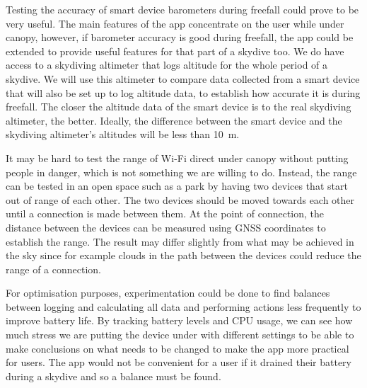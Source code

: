 \documentclass[11pt, a4paper, twocolumn]{article}
\begin{document}
Testing the accuracy of smart device barometers during freefall could prove to be very useful. The main features of the app concentrate on the user while under canopy, however, if barometer accuracy is good during freefall, the app could be extended to provide useful features for that part of a skydive too. We do have access to a skydiving altimeter that logs altitude for the whole period of a skydive. We will use this altimeter to compare data collected from a smart device that will also be set up to log altitude data, to establish how accurate it is during freefall. The closer the altitude data of the smart device is to the real skydiving altimeter, the better. Ideally, the difference between the smart device and the skydiving altimeter's altitudes will be less than \SI{10}{\metre}.

It may be hard to test the range of Wi-Fi direct under canopy without putting people in danger, which is not something we are willing to do. Instead, the range can be tested in an open space such as a park by having two devices that start out of range of each other. The two devices should be moved towards each other until a connection is made between them. At the point of connection, the distance between the devices can be measured using GNSS coordinates to establish the range. The result may differ slightly from what may be achieved in the sky since for example clouds in the path between the devices could reduce the range of a connection.

For optimisation purposes, experimentation could be done to find balances between logging and calculating all data and performing actions less frequently to improve battery life. By tracking battery levels and CPU usage, we can see how much stress we are putting the device under with different settings to be able to make conclusions on what needs to be changed to make the app more practical for users. The app would not be convenient for a user if it drained their battery during a skydive and so a balance must be found.
\end{document}
